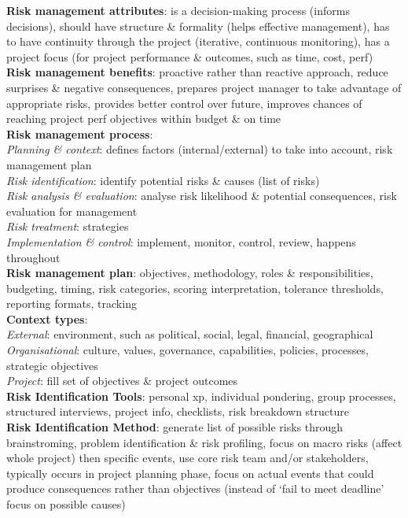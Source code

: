 \documentclass[a4paper]{article}
\begin{document}
\begin{multicols}{2}
        \textbf{Risk management attributes}: is a decision-making process (informs decisions), should have structure \& formality (helps effective management), has to have continuity through the project (iterative, continuous monitoring), has a project focus (for project performance \& outcomes, such as time, cost, perf)\\
        \textbf{Risk management benefits}: proactive rather than reactive approach, reduce surprises \& negative consequences, prepares project manager to take advantage of appropriate risks, provides better control over future, improves chances of reaching project perf objectives within budget \& on time\\
        \textbf{Risk management process}:\\
        \textit{Planning \& context}: defines factors (internal/external) to take into account, risk management plan\\
        \textit{Risk identification}: identify potential risks \& causes (list of risks)\\
        \textit{Risk analysis \& evaluation}: analyse risk likelihood \& potential consequences, risk evaluation for management\\
        \textit{Risk treatment}: strategies\\
        \textit{Implementation \& control}: implement, monitor, control, review, happens throughout\\
        \textbf{Risk management plan}: objectives, methodology, roles \& responsibilities, budgeting, timing, risk categories, scoring interpretation, tolerance thresholds, reporting formats, tracking\\
        \textbf{Context types}:\\
        \textit{External}: environment, such as political, social, legal, financial, geographical\\
        \textit{Organisational}: culture, values, governance, capabilities, policies, processes, strategic objectives\\
        \textit{Project}: fill set of objectives \& project outcomes\\
        \textbf{Risk Identification Tools}: personal xp, individual pondering, group processes, structured interviews, project info, checklists, risk breakdown structure\\
        \textbf{Risk Identification Method}: generate list of possible risks through brainstroming, problem identification \& risk profiling, focus on macro risks (affect whole project) then specific events, use core risk team and/or stakeholders, typically occurs in project planning phase, focus on actual events that could produce consequences rather than objectives (instead of `fail to meet deadline' focus on possible causes)\\

\end{multicols}
\end{document}
